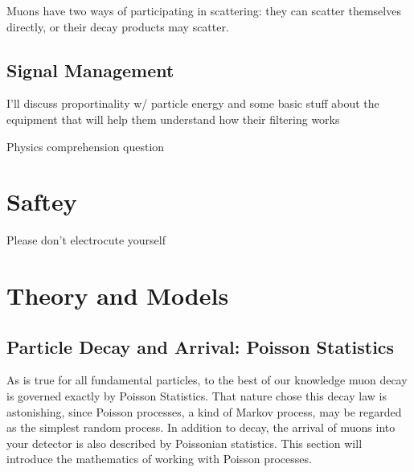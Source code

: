 \documentclass[aps,prb,groupedaddress,notitlepage,nofootinbib]{revtex4-1} %
\begin{document}
Muons have two ways of participating in scattering: they can scatter themselves directly, or their decay products may scatter. 

\subsection{Signal Management}
I'll discuss proportinality w/ particle energy and some basic stuff about the equipment that will help them understand how their filtering works
\begin{QQP}[]
{ Physics comprehension question }
\end{QQP}

\newpage
\section{Saftey}
Please don't electrocute yourself

\newpage
\section{Theory and Models}
\subsection{Particle Decay and Arrival: Poisson Statistics}
As is true for all fundamental particles, to the best of our knowledge muon decay is governed exactly by Poisson Statistics. That nature chose this decay law is astonishing, since Poisson processes, a kind of Markov process, may be regarded as the simplest random process. In addition to decay, the arrival of muons into your detector is also described by Poissonian statistics. This section will introduce the mathematics of working with Poisson processes. 
\medskip
\end{document}
